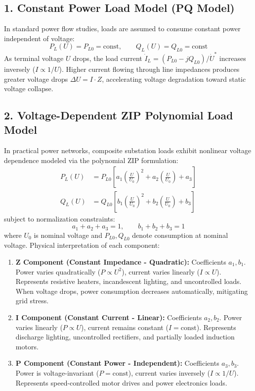 \documentclass[12pt,a4paper,oneside]{report}
\begin{document}
\subsection{1. Constant Power Load Model (PQ Model)}
In standard power flow studies, loads are assumed to consume constant power independent of voltage:
\begin{equation}
P_L(U) = P_{L0} = \text{const}, \qquad Q_L(U) = Q_{L0} = \text{const}
\end{equation}
As terminal voltage $U$ drops, the load current $\dot{I}_L = (P_{L0} - jQ_{L0})/\dot{U}^*$ increases inversely ($I \propto 1/U$). Higher current flowing through line impedances produces greater voltage drops $\Delta U = I \cdot Z$, accelerating voltage degradation toward static voltage collapse.

\subsection{2. Voltage-Dependent ZIP Polynomial Load Model}
In practical power networks, composite substation loads exhibit nonlinear voltage dependence modeled via the polynomial ZIP formulation:
\begin{align}
P_L(U) &= P_{L0} \left[ a_1 \left( \frac{U}{U_0} \right)^2 + a_2 \left( \frac{U}{U_0} \right) + a_3 \right] \\
Q_L(U) &= Q_{L0} \left[ b_1 \left( \frac{U}{U_0} \right)^2 + b_2 \left( \frac{U}{U_0} \right) + b_3 \right]
\end{align}
subject to normalization constraints:
\begin{equation}
a_1 + a_2 + a_3 = 1, \qquad b_1 + b_2 + b_3 = 1
\end{equation}
where $U_0$ is nominal voltage and $P_{L0}, Q_{L0}$ denote consumption at nominal voltage. Physical interpretation of each component:
\begin{enumerate}
    \item \textbf{Z Component (Constant Impedance - Quadratic):} Coefficients $a_1, b_1$. Power varies quadratically ($P \propto U^2$), current varies linearly ($I \propto U$). Represents resistive heaters, incandescent lighting, and uncontrolled loads. When voltage drops, power consumption decreases automatically, mitigating grid stress.
    \item \textbf{I Component (Constant Current - Linear):} Coefficients $a_2, b_2$. Power varies linearly ($P \propto U$), current remains constant ($I = \text{const}$). Represents discharge lighting, uncontrolled rectifiers, and partially loaded induction motors.
    \item \textbf{P Component (Constant Power - Independent):} Coefficients $a_3, b_3$. Power is voltage-invariant ($P = \text{const}$), current varies inversely ($I \propto 1/U$). Represents speed-controlled motor drives and power electronics loads.
\end{enumerate}
\end{document}
